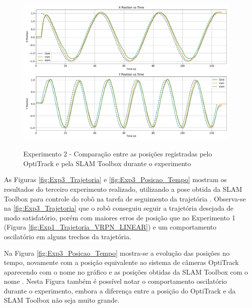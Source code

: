 \begin{figure}[htb]
    \centering
    \caption{Experimento 2 - Comparação entre as posições registradas pelo OptiTrack e pela SLAM Toolbox durante o experimento}
    \includegraphics[width=0.8\linewidth]{img/Resultados/Exp2_VRPN_Control_LEMNISCATA/Position_Comparison.pdf}
    \source
    \label{fig:Exp2_Comparacao_Posicao_v_tempo}
\end{figure}


As Figuras \ref{fig:Exp3_Trajetoria} e \ref{fig:Exp3_Posicao_Tempo} mostram os resultados do terceiro experimento realizado, utilizando a pose obtida da SLAM Toolbox para controle do robô na tarefa de seguimento da trajetória . Observa-se na \ref{fig:Exp3_Trajetoria} que o robô conseguiu seguir a trajetória desejada de modo satisfatório, porém com maiores erros de posição que no Experimento 1 (Figura \ref{fig:Exp1_Trajetoria_VRPN_LINEAR}) e um comportamento oscilatório em alguns trechos da trajetória.

Na Figura \ref{fig:Exp3_Posicao_Tempo} mostra-se a evolução das posições no tempo, novamente com a posição equivalente ao sistema de câmeras OptiTrack aparecendo com o nome  no gráfico e as posições obtidas da SLAM Toolbox com o nome . Nesta Figura também é possível notar o comportamento oscilatório durante o experimento, embora a diferença entre a posição do OptiTrack e da SLAM Toolbox não seja muito grande.


